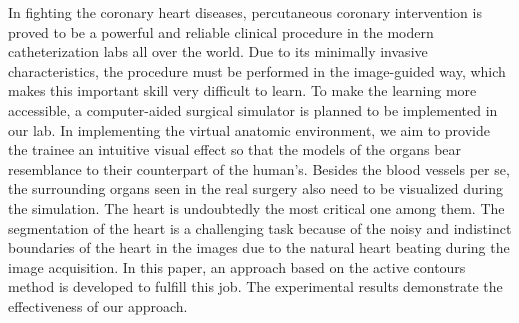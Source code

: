 
In fighting the coronary heart diseases, percutaneous coronary intervention is proved to be a powerful and reliable clinical procedure in the modern catheterization labs all over the world. %
Due to its minimally invasive characteristics, the procedure must be performed in the image-guided way, which makes this important skill very difficult to learn.
To make the learning more accessible, a computer-aided surgical simulator is planned to be implemented in our lab.
In implementing the virtual anatomic environment, we aim to provide the trainee an intuitive visual effect so that the models of the organs bear resemblance to their counterpart of the human's. %
Besides the blood vessels per se, the surrounding organs seen in the real surgery also need to be visualized during the simulation.
The heart is undoubtedly the most critical one among them.
The segmentation of the heart is a challenging task because of the noisy and indistinct boundaries of the heart in the images due to the natural heart beating during the image acquisition. %
In this paper, an approach based on the active contours method is developed to fulfill this job.
The experimental results demonstrate the effectiveness of our approach. 